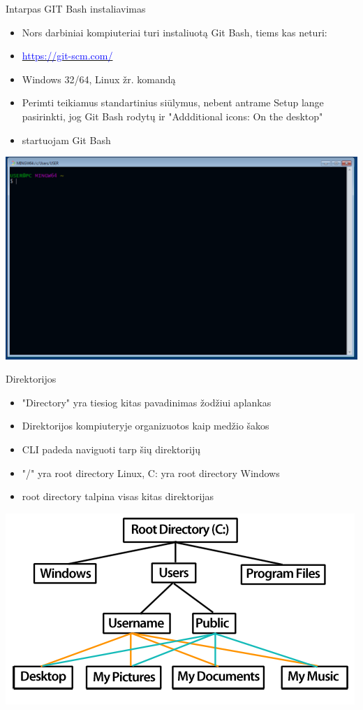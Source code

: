 \documentclass[11pt,xcolor=table]{beamer}
\begin{document}
\begin{frame}{Intarpas GIT Bash instaliavimas}
\begin{itemize}
\item Nors darbiniai kompiuteriai turi instaliuotą Git Bash, tiems kas neturi:
\item \href{https://git-scm.com/}{\textcolor{blue}{https://git-scm.com/}}
\item Windows 32/64, Linux žr. komandą
\item Perimti teikiamus standartinius siūlymus, nebent antrame Setup lange pasirinkti, jog Git Bash rodytų ir "Addditional icons: On the desktop"
\item startuojam Git Bash
\end{itemize}
\center
\includegraphics[scale=0.15]{Git_Bash_1.png}
\end{frame}
\begin{frame}{Direktorijos}
\begin{itemize}
\item "Directory" yra tiesiog kitas pavadinimas žodžiui aplankas
\item Direktorijos kompiuteryje organizuotos kaip medžio šakos
\item CLI padeda naviguoti tarp šių direktorijų
\item "/" yra root directory Linux, C: yra root directory Windows
\item root directory talpina visas kitas direktorijas
\end{itemize}
\center
\includegraphics[scale=1.5]{diagram_directory_win.png}
\end{frame}
\end{document}
